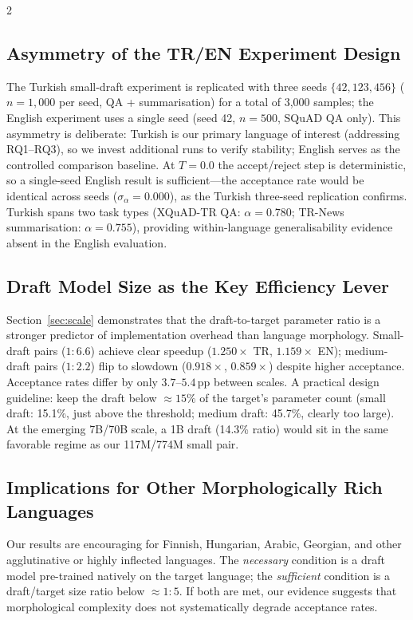 \documentclass[11pt,a4paper]{article}
\begin{document}
\begin{multicols}{2}
\subsection{Asymmetry of the TR/EN Experiment Design}
\label{sec:disc-symmetry}

The Turkish small-draft experiment is replicated with three seeds
$\{42, 123, 456\}$ ($n=1{,}000$ per seed, QA + summarisation) for a
total of 3,000 samples; the English experiment uses a single seed
(seed 42, $n=500$, SQuAD QA only).
This asymmetry is deliberate: Turkish is our primary language of
interest (addressing RQ1--RQ3), so we invest additional runs to
verify stability; English serves as the controlled comparison baseline.
At $T=0.0$ the accept/reject step is deterministic, so a single-seed
English result is sufficient—the acceptance rate would be identical
across seeds ($\sigma_{\alpha} = 0.000$), as the Turkish three-seed
replication confirms.
Turkish spans two task types (XQuAD-TR QA: $\alpha=0.780$; TR-News
summarisation: $\alpha=0.755$), providing within-language
generalisability evidence absent in the English evaluation.

\subsection{Draft Model Size as the Key Efficiency Lever}
\label{sec:disc-scale}

Section~\ref{sec:scale} demonstrates that the draft-to-target parameter
ratio is a stronger predictor of implementation overhead than language
morphology.
Small-draft pairs ($1\!:\!6.6$) achieve clear speedup ($1.250\!\times$
TR, $1.159\!\times$ EN); medium-draft pairs ($1\!:\!2.2$) flip to
slowdown ($0.918\!\times$, $0.859\!\times$) despite higher acceptance.
Acceptance rates differ by only $3.7$--$5.4$\,pp between scales.
A practical design guideline: keep the draft below ${\approx}15\%$ of
the target's parameter count (small draft: 15.1\%, just above the
threshold; medium draft: 45.7\%, clearly too large).
At the emerging 7B/70B scale, a 1B draft (14.3\% ratio) would sit
in the same favorable regime as our 117M/774M small pair.

\subsection{Implications for Other Morphologically Rich Languages}
\label{sec:disc-implications}

Our results are encouraging for Finnish, Hungarian, Arabic, Georgian,
and other agglutinative or highly inflected languages.
The \emph{necessary} condition is a draft model pre-trained natively
on the target language; the \emph{sufficient} condition is a
draft/target size ratio below $\approx\!1\!:\!5$.
If both are met, our evidence suggests that morphological complexity
does not systematically degrade acceptance rates.


\end{multicols}
\end{document}
